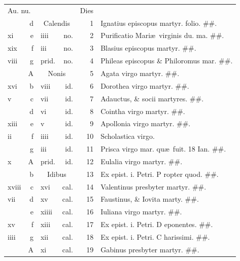 \documentclass[a5paper,10pt]{book}
\def\ae{æ}
\begin{document}
\begin{center}
\begin{tabular}{l r l r r l}
\multicolumn{2}{l}{\color{red}Au. nu.} & & & \color{red} Dies & \\
 & d & \multicolumn{2}{c}{\color{red} Calendis} & 1 & Ignatius episcopus martyr. folio. \color{black} \#\#.\\
xi & e & iiii & no. & 2 & \color{red} Purificatio Mari\ae \ virginis du. ma. \color{black} \#\#.\\
xix & f & iii & no. & 3 & Blasius episcopus martyr. \color{black} \#\#.\\
viii & g & \color{red} prid. & \color{red} no. & 4 & Phileas episcopus \& Philoromus mar. \color{black} \#\#.\\
 & \color{red} A & \multicolumn{2}{c}{\color{red} Nonis} & 5 & Agata virgo martyr. \color{black} \#\#.\\
xvi & b & viii & id. & 6 & Dorothea virgo martyr. \color{black} \#\#.\\
v & c & vii & id. & 7 & Adauctus, \& socii martyres. \color{black} \#\#.\\
 & d & vi & id. & 8 & Cointha virgo martyr. \color{black} \#\#.\\
xiii & e & v & id. & 9 & Apollonia virgo martyr. \color{black} \#\#.\\
ii & f & iiii & id. & 10 & Scholastica virgo. \\%
 & g & iii & id. & 11 & Prisca virgo mar. qu\ae \ fuit. 18 Ian. \color{black} \#\#.\\
x & \color{red} A & \color{red} prid. & \color{red} id. & 12 & Eulalia virgo martyr. \color{black} \#\#.\\
 & b & \multicolumn{2}{c}{\color{red} Idibus} & 13 & Ex epist. i. Petri. \color{red} P\color{black} ropter quod. \#\#.\\
xviii & c & xvi & cal. & 14 & Valentinus presbyter martyr. \color{black} \#\#.\\
vii & d & xv & cal. & 15 & Faustinus, \& Iovita marty. \color{black} \#\#.\\
 & e & xiiii & cal. & 16 & Iuliana virgo martyr. \color{black} \#\#.\\
xv & f & xiii & cal. & 17 & Ex epist. i. Petri. \color{red} D\color{black} eponentes. \#\#.\\
iiii & g & xii & cal. & 18 & Ex epist. i. Petri. \color{red} C\color{black} harissimi. \#\#.\\
 & \color{red} A & xi & cal. & 19 & Gabinus presbyter martyr. \color{black} \#\#.\\

\end{tabular}
\end{center}
\end{document}
